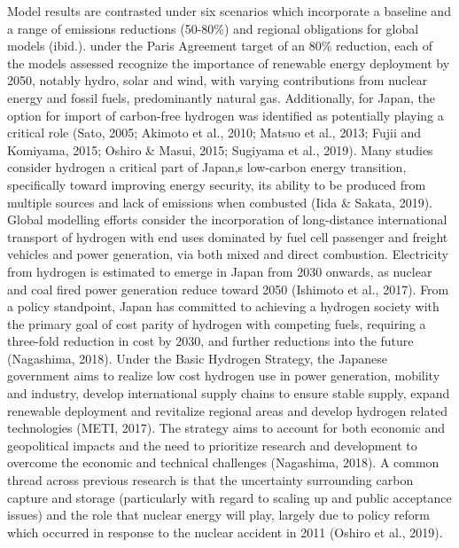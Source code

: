 Model results are contrasted under six scenarios which incorporate a baseline and a range of emissions reductions (50-80\%) and regional obligations for global models (ibid.). under the Paris Agreement target of an 80\% reduction, each of the models assessed recognize the importance of renewable energy deployment by 2050, notably hydro, solar and wind, with varying contributions from nuclear energy and fossil fuels, predominantly natural gas. Additionally, for Japan, the option for import of carbon-free hydrogen was identified as potentially playing a critical role (Sato, 2005; Akimoto et al., 2010; Matsuo et al., 2013; Fujii and Komiyama, 2015; Oshiro & Masui, 2015; Sugiyama et al., 2019). Many studies consider hydrogen a critical part of Japan,s low-carbon energy transition, specifically toward improving energy security, its ability to be produced from multiple sources and lack of emissions when combusted (Iida & Sakata, 2019). Global modelling efforts consider the incorporation of long-distance international transport of hydrogen with end uses dominated by fuel cell passenger and freight vehicles and power generation, via both mixed and direct combustion. Electricity from hydrogen is estimated to emerge in Japan from 2030 onwards, as nuclear and coal fired power generation reduce toward 2050 (Ishimoto et al., 2017). From a policy standpoint, Japan has committed to achieving a hydrogen society with the primary goal of cost parity of hydrogen with competing fuels, requiring a three-fold reduction in cost by 2030, and further reductions into the future (Nagashima, 2018). Under the Basic Hydrogen Strategy, the Japanese government aims to realize low cost hydrogen use in power generation, mobility and industry, develop international supply chains to ensure stable supply, expand renewable deployment and revitalize regional areas and develop hydrogen related technologies (METI, 2017). The strategy aims to account for both economic and geopolitical impacts and the need to prioritize research and development to overcome the economic and technical challenges (Nagashima, 2018). A common thread across previous research is that the uncertainty surrounding carbon capture and storage (particularly with regard to scaling up and public acceptance issues) and the role that nuclear energy will play, largely due to policy reform which occurred in response to the nuclear accident in 2011 (Oshiro et al., 2019). 
